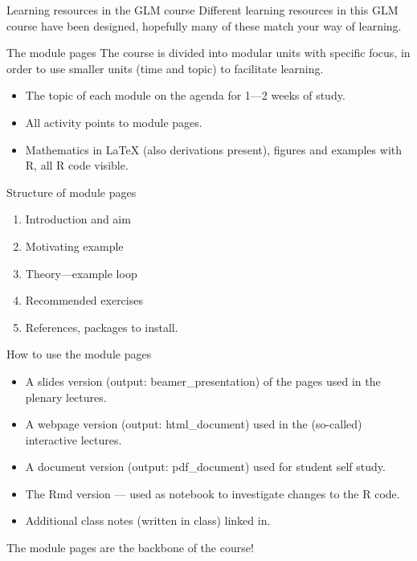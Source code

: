 \documentclass[
  ignorenonframetext,
]{beamer}
\providecommand{\tightlist}{%
  \setlength{\itemsep}{0pt}\setlength{\parskip}{0pt}}
\begin{document}
\begin{frame}{Learning resources in the GLM course}
\protect\hypertarget{learning-resources-in-the-glm-course}{}
Different learning resources in this GLM course have been designed,
hopefully many of these match your way of learning.

\begin{block}{The module pages}
\protect\hypertarget{the-module-pages}{}
The course is divided into modular units with specific focus, in order
to use smaller units (time and topic) to facilitate learning.

\begin{itemize}
\tightlist
\item
  The topic of each module on the agenda for 1---2 weeks of study.
\item
  All activity points to module pages.
\item
  Mathematics in LaTeX (also derivations present), figures and examples
  with R, all R code visible.
\end{itemize}
\end{block}
\end{frame}

\begin{frame}
\begin{block}{Structure of module pages}
\protect\hypertarget{structure-of-module-pages}{}
\begin{enumerate}
[1)]
\tightlist
\item
  Introduction and aim
\item
  Motivating example
\item
  Theory---example loop
\item
  Recommended exercises
\item
  References, packages to install.
\end{enumerate}
\end{block}
\end{frame}

\begin{frame}
\begin{block}{How to use the module pages}
\protect\hypertarget{how-to-use-the-module-pages}{}
\begin{itemize}
\tightlist
\item
  A slides version (output: beamer\_presentation) of the pages used in
  the plenary lectures.
\item
  A webpage version (output: html\_document) used in the (so-called)
  interactive lectures.
\item
  A document version (output: pdf\_document) used for student self
  study.
\item
  The Rmd version --- used as notebook to investigate changes to the R
  code.
\item
  Additional class notes (written in class) linked in.
\end{itemize}

The module pages are the backbone of the course!
\end{block}
\end{frame}
\end{document}
